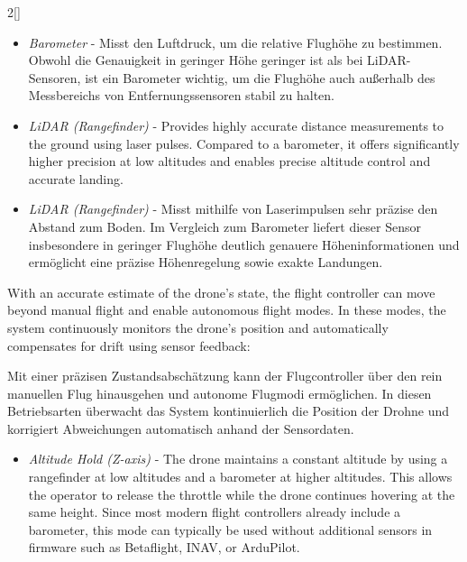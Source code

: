 \begin{paracol}{2}[]
\colger

\begin{itemize}
\item \textsl{Barometer} - Misst den Luftdruck, um die relative Flughöhe zu bestimmen. Obwohl die Genauigkeit in geringer Höhe geringer ist als bei LiDAR-Sensoren, ist ein Barometer wichtig, um die Flughöhe auch außerhalb des Messbereichs von Entfernungssensoren stabil zu halten.
\end{itemize}

\coleng

\begin{itemize}
\item \textsl{LiDAR (Rangefinder)} - Provides highly accurate distance measurements to the ground using laser pulses. Compared to a barometer, it offers significantly higher precision at low altitudes and enables precise altitude control and accurate landing.
\end{itemize}

\colger

\begin{itemize}
\item \textsl{LiDAR (Rangefinder)} - Misst mithilfe von Laserimpulsen sehr präzise den Abstand zum Boden. Im Vergleich zum Barometer liefert dieser Sensor insbesondere in geringer Flughöhe deutlich genauere Höheninformationen und ermöglicht eine präzise Höhenregelung sowie exakte Landungen.
\end{itemize}

\coleng

With an accurate estimate of the drone’s state, the flight controller can move beyond manual flight and enable autonomous flight modes. In these modes, the system continuously monitors the drone’s position and automatically compensates for drift using sensor feedback:

\colger

Mit einer präzisen Zustandsabschätzung kann der Flugcontroller über den rein manuellen Flug hinausgehen und autonome Flugmodi ermöglichen. In diesen Betriebsarten überwacht das System kontinuierlich die Position der Drohne und korrigiert Abweichungen automatisch anhand der Sensordaten.

\coleng

\begin{itemize}
\item \textsl{Altitude Hold (Z-axis)} - The drone maintains a constant altitude by using a rangefinder at low altitudes and a barometer at higher altitudes. This allows the operator to release the throttle while the drone continues hovering at the same height. Since most modern flight controllers already include a barometer, this mode can typically be used without additional sensors in firmware such as Betaflight, INAV, or ArduPilot.
\end{itemize}


\end{paracol}
